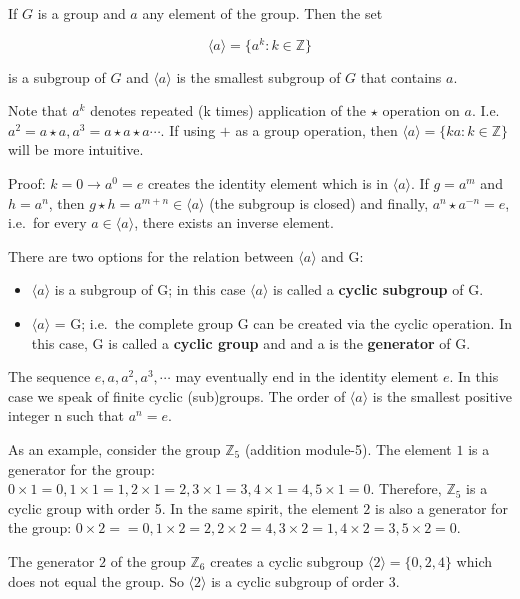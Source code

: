 If \(G\) is a group and \(a\) any element of the group. Then the set

\[
\langle a \rangle = \{a^k: k \in \mathbb{Z}\}
\]

is a subgroup of \(G\) and \(\langle a \rangle\) is the smallest
subgroup of \(G\) that contains \(a\).

Note that \(a^k\) denotes repeated (k times) application of the
\(\star\) operation on \(a\). I.e.
\(a^2 = a \star a, a^3 = a \star a \star a \cdots\). If using \(+\) as a
group operation, then \(\langle a \rangle = \{ka: k \in \mathbb{Z}\}\)
will be more intuitive.

Proof: \(k=0 \rightarrow a^0 = e\) creates the identity element which is
in \(\langle a \rangle\). If \(g = a^m\) and \(h = a^n\), then
\(g \star h = a^{m+n} \in \langle a \rangle\) (the subgroup is closed)
and finally, \(a^n \star a^{-n} = e\), i.e.~for every
\(a \in \langle a \rangle\), there exists an inverse element.

There are two options for the relation between \(\langle a \rangle\) and
G:

\begin{itemize}
\item
  \(\langle a \rangle\) is a subgroup of G; in this case
  \(\langle a \rangle\) is called a \textbf{cyclic subgroup} of G.
\item
  \(\langle a \rangle\) = G; i.e.~the complete group G can be created
  via the cyclic operation. In this case, G is called a \textbf{cyclic
  group} and and a is the \textbf{generator} of G.
\end{itemize}

The sequence \(e, a, a^2, a^3, \cdots\) may eventually end in the
identity element \(e\). In this case we speak of finite cyclic
(sub)groups. The order of \(\langle a \rangle\) is the smallest positive
integer n such that \(a^n = e\).

As an example, consider the group \(\mathbb{Z}_5\) (addition module-5).
The element \(1\) is a generator for the group:
\(0 \times 1 = 0, 1 \times 1 = 1, 2 \times 1 = 2, 3 \times 1 = 3, 4 \times 1 = 4, 5 \times 1 = 0\).
Therefore, \(\mathbb{Z}_5\) is a cyclic group with order 5. In the same
spirit, the element \(2\) is also a generator for the group:
\(0 \times 2 = =0, 1 \times 2 = 2, 2 \times 2 = 4, 3 \times 2 = 1, 4 \times 2 = 3, 5 \times 2 = 0\).

The generator \(2\) of the group \(\mathbb{Z}_6\) creates a cyclic
subgroup \(\langle 2 \rangle = \{0, 2, 4\}\) which does not equal the
group. So \(\langle 2 \rangle\) is a cyclic subgroup of order 3.
